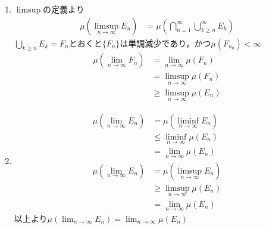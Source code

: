 \documentclass[dvipdfmx, leqno]{jsreport}
\begin{document}
\begin{souanswer}
\begin{enumerate}
    \item $\limsup$の定義より
\begin{align}
    \mu\left(\limsup_{n\to \infty} E_n\right)
    &= \mu\left(\bigcap_{n= 1}^\infty \bigcup_{k\ge n}^\infty E_k\right) 
\end{align}
    $\bigcup_{k\ge n} E_k= F_n$とおくと$\{F_n\}$は単調減少であり，かつ$\mu(F_{n_0})< \infty$
\begin{align}
    \mu\left(\lim_{n\to \infty} F_n\right)
    &= \lim_{n\to \infty} \mu(F_n)\\
    &= \limsup_{n\to \infty} \mu(F_n)\\
    &\ge \limsup_{n\to \infty} \mu(E_n)
\end{align}
    \item 
\begin{align}
    \mu\left(\lim_{n\to \infty} E_n\right)
    &= \mu\left(\liminf_{n\to \infty} E_n\right)\\
    &\le \liminf_{n\to \infty} \mu(E_n)\\
    &= \lim_{n\to \infty} \mu(E_n)\\
    \mu\left(\lim_{n\to \infty} E_n\right)
    &= \mu\left(\limsup_{n\to \infty} E_n\right)\\
    &\ge \limsup_{n\to \infty} \mu(E_n)\\
    &= \lim_{n\to \infty} \mu(E_n)
\end{align}
    以上より$\mu\left(\lim_{n\to \infty} E_n\right)= \lim_{n\to \infty} \mu(E_n)$
\end{enumerate}
\end{souanswer}
\end{document}
